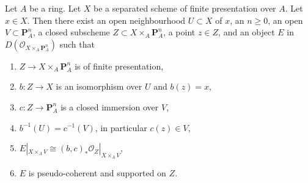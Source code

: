 \begin{lemma}
\label{lemma-derived-chow}
Let $A$ be a ring. Let $X$ be a separated scheme of finite presentation
over $A$. Let $x \in X$. Then there exist
an open neighbourhood $U \subset X$ of $x$,
an $n \geq 0$,
an open $V \subset \mathbf{P}^n_A$,
a closed subscheme $Z \subset X \times_A \mathbf{P}^n_A$,
a point $z \in Z$, and
an object $E$ in $D(\mathcal{O}_{X \times_A \mathbf{P}^n_A})$ such that
\begin{enumerate}
\item $Z \to X \times_A \mathbf{P}^n_A$ is of finite presentation,
\item $b : Z \to X$ is an isomorphism over $U$ and $b(z) = x$,
\item $c : Z \to \mathbf{P}^n_A$ is a closed immersion over $V$,
\item $b^{-1}(U) = c^{-1}(V)$, in particular $c(z) \in V$,
\item $E|_{X \times_A V} \cong
(b, c)_*\mathcal{O}_Z|_{X \times_A V}$,
\item $E$ is pseudo-coherent and supported on $Z$.
\end{enumerate}
\end{lemma}

